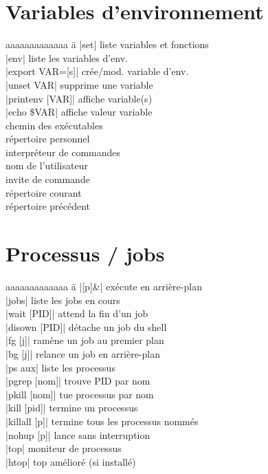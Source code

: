 \documentclass{article}
\begin{document}
\begin{multicols}{4}
    \section*{Variables d'environnement}
    \begin{tabbing}
        aaaaaaaaaaaaa \= a \kill
        \code|set| \> liste variables et fonctions \\
        \code|env| \> liste les variables d'env. \\
        \code|export VAR=[s]| \> crée/mod. variable d'env. \\
        \code|unset VAR| \> supprime une variable \\
        \code|printenv [VAR]| \> affiche variable(s) \\
        \code|echo \$VAR| \> affiche valeur variable \\
         \> chemin des exécutables \\
         \> répertoire personnel \\
         \> interpréteur de commandes \\
         \> nom de l'utilisateur \\
         \> invite de commande \\
         \> répertoire courant \\
         \> répertoire précédent \\
    \end{tabbing}

    \section*{Processus / jobs}
    \begin{tabbing}
        aaaaaaaaaaaaa \= a \kill
        \code|[p]&| \> exécute en arrière-plan \\
        \code|jobs| \> liste les jobs en cours \\
        \code|wait [PID]| \> attend la fin d'un job \\
        \code|disown [PID]| \> détache un job du shell \\
        \code|fg [j]| \> ramène un job au premier plan \\
        \code|bg [j]| \> relance un job en arrière-plan \\
        \code|ps aux| \> liste les processus \\
        \code|pgrep [nom]| \> trouve PID par nom \\
        \code|pkill [nom]| \> tue processus par nom \\
        \code|kill [pid]| \> termine un processus \\
        \code|killall [p]| \> termine tous les processus nommés \\
        \code|nohup [p]| \> lance sans interruption \\
        \code|top| \> moniteur de processus \\
        \code|htop| \> top amélioré (si installé)


\end{tabbing}
\end{multicols}
\end{document}
